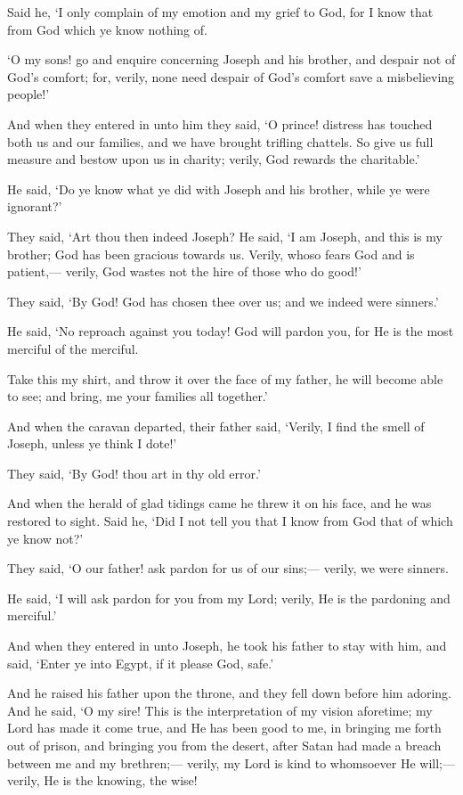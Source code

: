 \documentclass[fontsize=14pt, letterpaper, notitlepage, openany, DIV=12]{scrbook} %
\begin{document}
\noindent[12:86]
Said he, `I only complain of my emotion and my grief to God, for I know that from God
which ye know nothing of.

\noindent[12:87]
`O my sons! go and enquire concerning Joseph and his brother, and despair not of God's
comfort; for, verily, none need despair of God's comfort save a misbelieving people!'

\noindent[12:88]
And when they entered in unto him they said, `O prince! distress has touched both us and
our families, and we have brought trifling chattels. So give us full measure and bestow upon us
in charity; verily, God rewards the charitable.'

\noindent[12:89]
He said, `Do ye know what ye did with Joseph and his brother, while ye were ignorant?'

\noindent[12:90]
They said, `Art thou then indeed Joseph? He said, `I am Joseph, and this is my brother;
God has been gracious towards us. Verily, whoso fears God and is patient,--- verily, God wastes
not the hire of those who do good!'

\noindent[12:91]
They said, `By God! God has chosen thee over us; and we indeed were sinners.'

\noindent[12:92]
He said, `No reproach against you today! God will pardon you, for He is the most
merciful of the merciful.

\noindent[12:93]
Take this my shirt, and throw it over the face of my father, he will become able to see;
and bring, me your families all together.'

\noindent[12:94]
And when the caravan departed, their father said, `Verily, I find the smell of Joseph,
unless ye think I dote!'

\noindent[12:95]
They said, `By God! thou art in thy old error.'

\noindent[12:96]
And when the herald of glad tidings came he threw it on his face, and he was restored to
sight. Said he, `Did I not tell you that I know from God that of which ye know not?'

\noindent[12:97]
They said, `O our father! ask pardon for us of our sins;--- verily, we were sinners.

\noindent[12:98]
He said, `I will ask pardon for you from my Lord; verily, He is the pardoning and
merciful.'

\noindent[12:99]
And when they entered in unto Joseph, he took his father to stay with him, and said,
`Enter ye into Egypt, if it please God, safe.'

\noindent[12:100]
And he raised his father upon the throne, and they fell down before him adoring. And he
said, `O my sire! This is the interpretation of my vision aforetime; my Lord has made it come
true, and He has been good to me, in bringing me forth out of prison, and bringing you from the
desert, after Satan had made a breach between me and my brethren;--- verily, my Lord is kind to
whomsoever He will;--- verily, He is the knowing, the wise!
\end{document}
